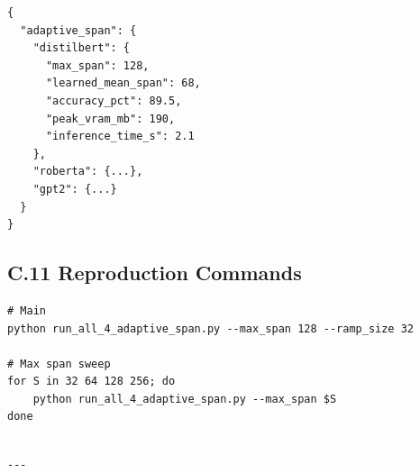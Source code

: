 \begin{lstlisting}
{
  "adaptive_span": {
    "distilbert": {
      "max_span": 128,
      "learned_mean_span": 68,
      "accuracy_pct": 89.5,
      "peak_vram_mb": 190,
      "inference_time_s": 2.1
    },
    "roberta": {...},
    "gpt2": {...}
  }
}
\end{lstlisting}

\subsection{C.11 Reproduction Commands}

\begin{lstlisting}
# Main
python run_all_4_adaptive_span.py --max_span 128 --ramp_size 32

# Max span sweep
for S in 32 64 128 256; do
    python run_all_4_adaptive_span.py --max_span $S
done
\end{lstlisting}
\begin{lstlisting}

---
\end{lstlisting}